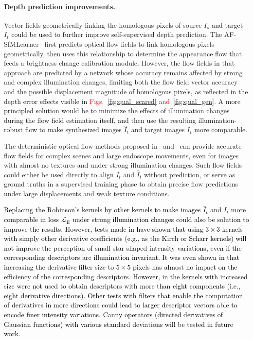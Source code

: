 \documentclass[a4paper,fleqn]{cas-dc}
\begin{document}
\paragraph{Depth prediction improvements.}
Vector fields geometrically linking the homologous pixels of source $I_s$ and target $I_t$ could be used to further improve self-supervised depth prediction. The AF-SfMLearner~\citep{Shao_MIA_2022} first predicts optical flow fields to link homologous pixels geometrically, then uses this relationship to determine the appearance flow that feeds a brightness change calibration module. However, the flow fields in that approach are predicted by a network whose accuracy remains affected by strong and complex illumination changes, limiting both the flow field vector accuracy and the possible displacement magnitude of homologous pixels, as reflected in the depth error effects visible in \textcolor{red}{Figs.~\ref{fig:qual_scared} and~\ref{fig:qual_gen}.} A more principled solution would be to minimize the effects of illumination changes during the flow field estimation itself, and then use the resulting illumination-robust flow to make synthesized images $\hat{I}_t$ and target images $I_t$ more comparable. 
%

The deterministic optical flow methods proposed in~\citep{Trinh_CVIU_2019} and~\citep{Weibel_PR_2012} can provide accurate flow fields for complex scenes and large endoscope movements, even for images with almost no textures and under strong illumination changes. Such flow fields could either be used directly to align $I_t$ and $\hat{I}_t$ without prediction, or serve as ground truths in a supervised training phase to obtain precise flow predictions under large displacements and weak texture conditions.

\textcolor{black}{
Replacing the Robinson's kernels by other kernels to make images $\hat{I}_t$ and $I_t$ more comparable in loss $\mathcal{L}_{\textrm{II}}$ under strong illumination changes could also be solution to improve the results. However, tests made in \citep{Trinh_CVIU_2019} have shown that using $3\times 3$ kernels with simply other derivative coefficients (e.g., as the Kirch or Scharr kernels) will not improve the perception of small star shaped intensity variations, even if the corresponding descriptors are illumination invariant. It was even shown in \citep{Daul2026SPIE} that increasing the derivative filter size to $5\times 5$ pixels has almost no impact on the efficiency of the corresponding descriptors. However, in \citep{Daul2026SPIE} the kernels with increased size were not used to obtain descriptors with more than eight components (i.e., eight derivative directions). Other tests with filters that enable the computation of derivatives in more directions could lead to larger descriptor vectors able to encode finer intensity variations. Canny operators (directed derivatives of Gaussian functions) with various standard deviations will be tested in future work.}        
%
\end{document}
